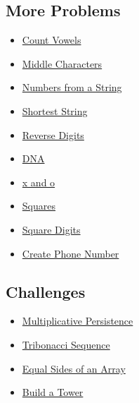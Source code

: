 \documentclass[12pt, a4paper]{article}
\begin{document}
\subsection{More Problems}
\label{sec:org26b6dc4}
\begin{itemize}
\item \href{https://www.codewars.com/kata/54ff3102c1bad923760001f3}{Count Vowels}
\item \href{https://www.codewars.com/kata/56747fd5cb988479af000028}{Middle Characters}
\item \href{https://www.codewars.com/kata/554b4ac871d6813a03000035}{Numbers from a String}
\item \href{https://www.codewars.com/kata/57cebe1dc6fdc20c57000ac9}{Shortest String}
\item \href{https://www.codewars.com/kata/5467e4d82edf8bbf40000155}{Reverse Digits}
\item \href{https://www.codewars.com/kata/554e4a2f232cdd87d9000038}{DNA}
\item \href{https://www.codewars.com/kata/55908aad6620c066bc00002a}{x and o}
\item \href{https://www.codewars.com/kata/54c27a33fb7da0db0100040e}{Squares}
\item \href{https://www.codewars.com/kata/546e2562b03326a88e000020}{Square Digits}
\item \href{https://www.codewars.com/kata/525f50e3b73515a6db000b83}{Create Phone Number}
\end{itemize}
\subsection{Challenges}
\label{sec:org9fd0eb3}
\begin{itemize}
\item \href{https://www.codewars.com/kata/55bf01e5a717a0d57e0000ec}{Multiplicative Persistence}
\item \href{https://www.codewars.com/kata/556deca17c58da83c00002db}{Tribonacci Sequence}
\item \href{https://www.codewars.com/kata/5679aa472b8f57fb8c000047}{Equal Sides of an Array}
\item \href{https://www.codewars.com/kata/576757b1df89ecf5bd00073b}{Build a Tower}
\end{itemize}
\end{document}
